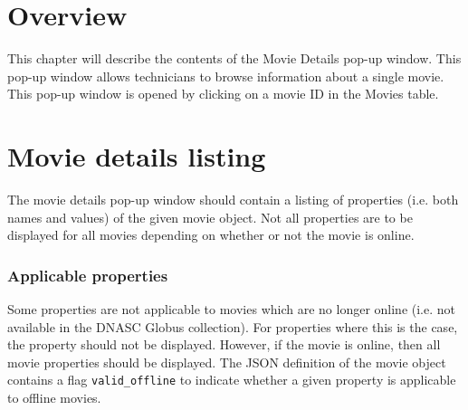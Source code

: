 
\section{Overview}

This chapter will describe the contents of the Movie Details pop-up window. This pop-up
window allows technicians to browse information about a single movie. This pop-up window 
is opened by clicking on a movie ID in the Movies table.

\section{Movie details listing}

The movie details pop-up window should contain a listing of properties (i.e. both 
names and values) of the given movie object. Not all properties are to be displayed
for all movies depending on whether or not the movie is online.

\subsubsection{Applicable properties}

Some properties are not applicable to movies 
which are no longer online (i.e. not available in the DNASC Globus collection). For properties
where this is the case, the property should not be displayed. However, if the movie is online,
then all movie properties should be displayed. The JSON definition of the movie object 
contains a flag \texttt{valid\_offline} to indicate whether a given property is applicable
to offline movies.